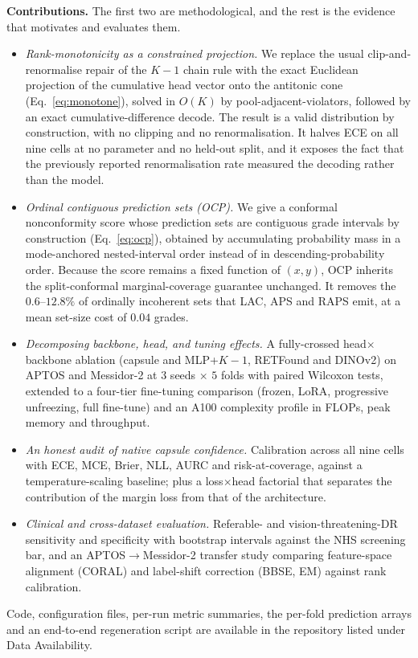 \documentclass[journal]{IEEEtran}
\begin{document}
\noindent\textbf{Contributions.} The first two are methodological, and the rest is the evidence that motivates and evaluates them.
\begin{itemize}
    \item \emph{Rank-monotonicity as a constrained projection.} We replace the usual clip-and-renormalise repair of the $K{-}1$ chain rule with the exact Euclidean projection of the cumulative head vector onto the antitonic cone (Eq.~\eqref{eq:monotone}), solved in $O(K)$ by pool-adjacent-violators, followed by an exact cumulative-difference decode. The result is a valid distribution by construction, with no clipping and no renormalisation. It halves ECE on all nine cells at no parameter and no held-out split, and it exposes the fact that the previously reported renormalisation rate measured the decoding rather than the model.
    \item \emph{Ordinal contiguous prediction sets (OCP).} We give a conformal nonconformity score whose prediction sets are contiguous grade intervals by construction (Eq.~\eqref{eq:ocp}), obtained by accumulating probability mass in a mode-anchored nested-interval order instead of in descending-probability order. Because the score remains a fixed function of $(x,y)$, OCP inherits the split-conformal marginal-coverage guarantee unchanged. It removes the $0.6$--$12.8\%$ of ordinally incoherent sets that LAC, APS and RAPS emit, at a mean set-size cost of $0.04$ grades.
    \item \emph{Decomposing backbone, head, and tuning effects.} A fully-crossed head$\times$backbone ablation (capsule and MLP+$K{-}1$, RETFound and DINOv2) on APTOS and Messidor-2 at $3$ seeds $\times$ $5$ folds with paired Wilcoxon tests, extended to a four-tier fine-tuning comparison (frozen, LoRA, progressive unfreezing, full fine-tune) and an A100 complexity profile in FLOPs, peak memory and throughput.
    \item \emph{An honest audit of native capsule confidence.} Calibration across all nine cells with ECE, MCE, Brier, NLL, AURC and risk-at-coverage, against a temperature-scaling baseline; plus a loss$\times$head factorial that separates the contribution of the margin loss from that of the architecture.
    \item \emph{Clinical and cross-dataset evaluation.} Referable- and vision-threatening-DR sensitivity and specificity with bootstrap intervals against the NHS screening bar, and an APTOS$\to$Messidor-2 transfer study comparing feature-space alignment (CORAL) and label-shift correction (BBSE, EM) against rank calibration.
\end{itemize}
Code, configuration files, per-run metric summaries, the per-fold prediction arrays and an end-to-end regeneration script are available in the repository listed under Data Availability.
\end{document}
